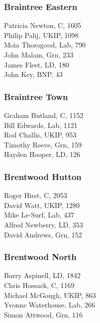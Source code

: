 \documentclass[a4paper,openany,10pt]{book}
\begin{document}
\subsubsection*{Braintree Eastern}



Patricia Newton, C, 1605\\
Philip Palij, UKIP, 1098\\
Moia Thorogood, Lab, 790\\
John Malam, Grn, 233\\
James Fleet, LD, 180\\
John Key, BNP, 43\\


\subsubsection*{Braintree Town}



Graham Butland, C, 1152\\
Bill Edwards, Lab, 1121\\
Rod Challis, UKIP, 953\\
Timothy Reeve, Grn, 159\\
Hayden Hooper, LD, 126\\


\subsubsection*{Brentwood Hutton}



Roger Hirst, C, 2053\\
David Watt, UKIP, 1280\\
Mike Le-Surf, Lab, 437\\
Alfred Newberry, LD, 353\\
David Andrews, Grn, 152\\


\subsubsection*{Brentwood North}



Barry Aspinell, LD, 1842\\
Chris Hossack, C, 1169\\
Michael McGough, UKIP, 863\\
Yvonne Waterhouse, Lab, 266\\
Simon Attwood, Grn, 116\\
\end{document}
